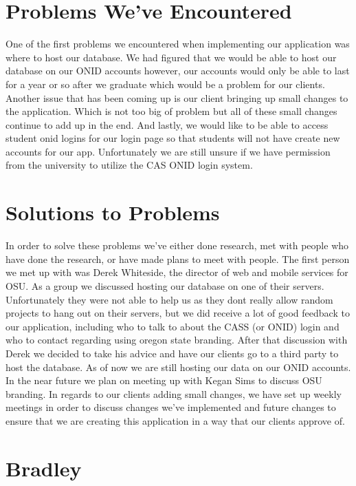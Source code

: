 \documentclass[draftclsnofoot, onecolumn, 10pt, compsoc]{IEEEtran}
\begin{document}
   \section{Problems We've Encountered}
      One of the first problems we encountered when implementing our application was where to host our database. We had figured that we would be able to host our database on our ONID accounts however, our accounts would only be able to last for a year or so after we graduate which would be a problem for our clients. Another issue that has been coming up is our client bringing up small changes to the application. Which is not too big of problem but all of these small changes continue to add up in the end. And lastly, we would like to be able to access student onid logins for our login page so that students will not have create new accounts for our app. Unfortunately we are still unsure if we have permission from the university to utilize the CAS ONID login system.

   \section{Solutions to Problems}
      In order to solve these problems we’ve either done research, met with people who have done the research, or have made plans to meet with people. The first person we met up with was Derek Whiteside, the director of web and mobile services for OSU. As a group we discussed hosting our database on one of their servers. Unfortunately they were not able to help us as they dont really allow random projects to hang out on their servers, but we did receive a lot of good feedback to our application, including who to talk to about the CASS (or ONID) login and who to contact regarding using oregon state branding. After that discussion with Derek we decided to take his advice and have our clients go to a third party to host the database. As of now we are still hosting our data on our ONID accounts. In the near future we plan on meeting up with Kegan Sims to discuss OSU branding.  In regards to our clients adding small changes, we have set up weekly meetings in order to discuss changes we’ve implemented and future changes to ensure that we are creating this application in a way that our clients approve of.

   \section{Bradley}
\end{document}
